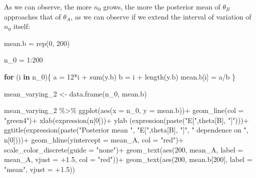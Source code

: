 \documentclass[
  11pt,
]{article}
\newenvironment{Shaded}{\begin{snugshade}}{\end{snugshade}}
\newcommand{\AttributeTok}[1]{\textcolor[rgb]{0.77,0.63,0.00}{#1}}
\newcommand{\ControlFlowTok}[1]{\textcolor[rgb]{0.13,0.29,0.53}{\textbf{#1}}}
\newcommand{\DecValTok}[1]{\textcolor[rgb]{0.00,0.00,0.81}{#1}}
\newcommand{\FloatTok}[1]{\textcolor[rgb]{0.00,0.00,0.81}{#1}}
\newcommand{\FunctionTok}[1]{\textcolor[rgb]{0.00,0.00,0.00}{#1}}
\newcommand{\NormalTok}[1]{#1}
\newcommand{\OtherTok}[1]{\textcolor[rgb]{0.56,0.35,0.01}{#1}}
\newcommand{\SpecialCharTok}[1]{\textcolor[rgb]{0.00,0.00,0.00}{#1}}
\newcommand{\StringTok}[1]{\textcolor[rgb]{0.31,0.60,0.02}{#1}}
\begin{document}
As we can observe, the more \(n_0\) grows, the more the posterior mean
of \(\theta_B\) approaches that of \(\theta_A\), as we can observe if we
extend the interval of variation of \(n_0\) itself:

\begin{Shaded}
\begin{Highlighting}[]
\NormalTok{mean.b }\OtherTok{=} \FunctionTok{rep}\NormalTok{(}\DecValTok{0}\NormalTok{, }\DecValTok{200}\NormalTok{)}

\NormalTok{n\_0 }\OtherTok{=} \DecValTok{1}\SpecialCharTok{:}\DecValTok{200}

\ControlFlowTok{for}\NormalTok{ (i }\ControlFlowTok{in}\NormalTok{ n\_0)\{}
\NormalTok{  a }\OtherTok{=} \DecValTok{12}\SpecialCharTok{*}\NormalTok{i }\SpecialCharTok{+} \FunctionTok{sum}\NormalTok{(y.b)}
\NormalTok{  b }\OtherTok{=}\NormalTok{ i }\SpecialCharTok{+} \FunctionTok{length}\NormalTok{(y.b)}
\NormalTok{  mean.b[i] }\OtherTok{=}\NormalTok{ a}\SpecialCharTok{/}\NormalTok{b}
\NormalTok{\}}

\NormalTok{mean\_varying\_2 }\OtherTok{\textless{}{-}} \FunctionTok{data.frame}\NormalTok{(n\_0, mean.b)}
\end{Highlighting}
\end{Shaded}

\begin{Shaded}
\begin{Highlighting}[]
\NormalTok{mean\_varying\_2 }\SpecialCharTok{\%\textgreater{}\%} \FunctionTok{ggplot}\NormalTok{(}\FunctionTok{aes}\NormalTok{(}\AttributeTok{x =}\NormalTok{ n\_0, }\AttributeTok{y =}\NormalTok{ mean.b))}\SpecialCharTok{+}
  \FunctionTok{geom\_line}\NormalTok{(}\AttributeTok{col =} \StringTok{"green4"}\NormalTok{)}\SpecialCharTok{+}
  \FunctionTok{xlab}\NormalTok{(}\FunctionTok{expression}\NormalTok{(n[}\DecValTok{0}\NormalTok{]))}\SpecialCharTok{+}
  \FunctionTok{ylab}\NormalTok{ (}\FunctionTok{expression}\NormalTok{(}\FunctionTok{paste}\NormalTok{(}\StringTok{"E["}\NormalTok{,theta[B], }\StringTok{"]"}\NormalTok{)))}\SpecialCharTok{+}
  \FunctionTok{ggtitle}\NormalTok{(}\FunctionTok{expression}\NormalTok{(}\FunctionTok{paste}\NormalTok{(}\StringTok{"Posterior mean "}\NormalTok{, }\StringTok{"E["}\NormalTok{,theta[B], }\StringTok{"]"}\NormalTok{, }\StringTok{" dependence on "}\NormalTok{, n[}\DecValTok{0}\NormalTok{])))}\SpecialCharTok{+}
  \FunctionTok{geom\_hline}\NormalTok{(}\AttributeTok{yintercept =}\NormalTok{ mean\_A, }\AttributeTok{col =} \StringTok{"red"}\NormalTok{)}\SpecialCharTok{+}
  \FunctionTok{scale\_color\_discrete}\NormalTok{(}\AttributeTok{guide =} \StringTok{"none"}\NormalTok{)}\SpecialCharTok{+}
  \FunctionTok{geom\_text}\NormalTok{(}\FunctionTok{aes}\NormalTok{(}\DecValTok{200}\NormalTok{, mean\_A, }\AttributeTok{label =}\NormalTok{ mean\_A, }\AttributeTok{vjust =} \SpecialCharTok{+}\FloatTok{1.5}\NormalTok{, }\AttributeTok{col =} \StringTok{"red"}\NormalTok{))}\SpecialCharTok{+}
  \FunctionTok{geom\_text}\NormalTok{(}\FunctionTok{aes}\NormalTok{(}\DecValTok{200}\NormalTok{, mean.b[}\DecValTok{200}\NormalTok{], }\AttributeTok{label =} \StringTok{"mean"}\NormalTok{, }\AttributeTok{vjust =} \SpecialCharTok{+}\FloatTok{1.5}\NormalTok{))}
\end{Highlighting}
\end{Shaded}
\end{document}
